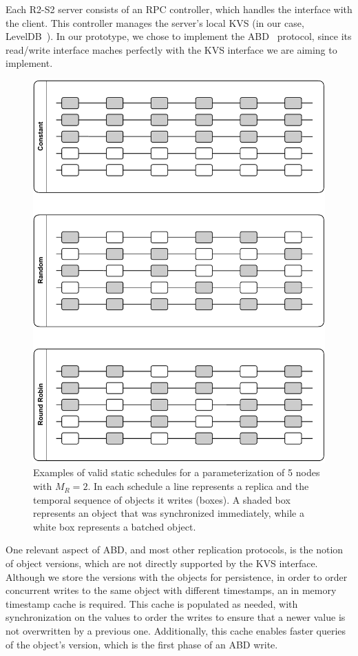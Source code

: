 Each \ac{R2-S2} server consists of an RPC controller, which
handles the interface with the client. This controller manages
the server's local \ac{KVS} (in our case,
LevelDB~\cite{leveldb}). In our prototype, we chose to implement
the ABD~\cite{abd} protocol, since its read/write interface
maches perfectly with the \ac{KVS} interface we are aiming to
implement.

\begin{figure}[ht!]
    \centering
    \includegraphics[width=0.75\linewidth]{img/schedules}
    \caption{Examples of valid static schedules for a
    parameterization of 5 nodes with $M_R = 2$. In each
    schedule a line represents a replica and the temporal sequence of
    objects it writes (boxes). A shaded box represents an object
    that was synchronized immediately, while a white box
    represents a batched object.}\label{fig:schedules}
\end{figure}
One relevant aspect of \ac{ABD}, and most other replication
protocols, is the notion of object versions, which are not directly supported by the
\ac{KVS} interface. Although we store the versions with the
objects for persistence, in order to order concurrent writes to the same object with
different timestamps, an in memory timestamp cache is required. This
cache is populated as needed, with synchronization on the values
to order the writes to ensure that a newer value is not
overwritten by a previous one. Additionally, this cache enables
faster queries of the object's version, which is the first phase
of an \ac{ABD} write.

